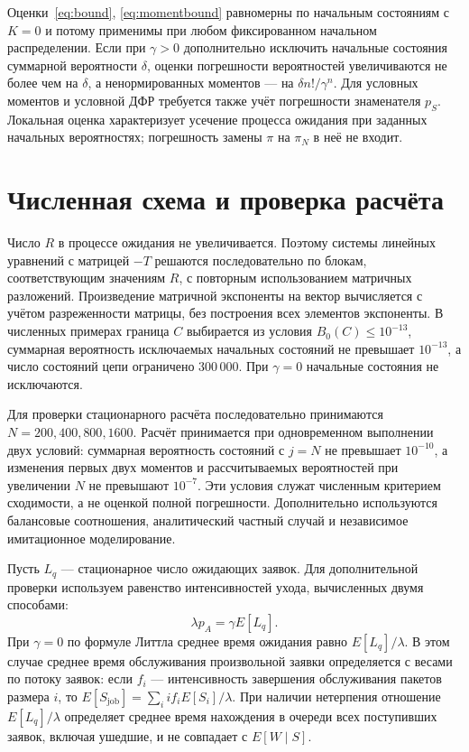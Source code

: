 Оценки~\eqref{eq:bound}, \eqref{eq:momentbound} равномерны по начальным состояниям с $K=0$ и потому применимы при любом фиксированном начальном распределении. Если при $\gamma>0$ дополнительно исключить начальные состояния суммарной вероятности $\delta$, оценки погрешности вероятностей увеличиваются не более чем на $\delta$, а ненормированных моментов --- на $\delta n!/\gamma^n$. Для условных моментов и условной ДФР требуется также учёт погрешности знаменателя $p_S$. Локальная оценка характеризует усечение процесса ожидания при заданных начальных вероятностях; погрешность замены $\pi$ на $\pi_N$ в неё не входит.

\section*{Численная схема и проверка расчёта}

Число $R$ в процессе ожидания не увеличивается. Поэтому системы линейных уравнений с матрицей $-T$ решаются последовательно по блокам, соответствующим значениям $R$, с повторным использованием матричных разложений. Произведение матричной экспоненты на вектор вычисляется с учётом разреженности матрицы, без построения всех элементов экспоненты. В численных примерах граница $C$ выбирается из условия $B_0(C)\leq10^{-13}$, суммарная вероятность исключаемых начальных состояний не превышает $10^{-13}$, а число состояний цепи ограничено 300\,000. При $\gamma=0$ начальные состояния не исключаются.

Для проверки стационарного расчёта последовательно принимаются $N=200,400,800,1600$. Расчёт принимается при одновременном выполнении двух условий: суммарная вероятность состояний с $j=N$ не превышает $10^{-10}$, а изменения первых двух моментов и рассчитываемых вероятностей при увеличении $N$ не превышают $10^{-7}$. Эти условия служат численным критерием сходимости, а не оценкой полной погрешности. Дополнительно используются балансовые соотношения, аналитический частный случай и независимое имитационное моделирование.

Пусть $L_q$ --- стационарное число ожидающих заявок. Для дополнительной проверки используем равенство интенсивностей ухода, вычисленных двумя способами:
\begin{equation}\label{eq:flow}
 \lambda p_A=\gamma E[L_q].
\end{equation}
При $\gamma=0$ по формуле Литтла среднее время ожидания равно $E[L_q]/\lambda$. В этом случае среднее время обслуживания произвольной заявки определяется с весами по потоку заявок: если $f_i$ --- интенсивность завершения обслуживания пакетов размера $i$, то $E[S_{\mathrm{job}}]=\sum_i i f_i E[S_i]/\lambda$. При наличии нетерпения отношение $E[L_q]/\lambda$ определяет среднее время нахождения в очереди всех поступивших заявок, включая ушедшие, и не совпадает с $E[W\mid S]$.

